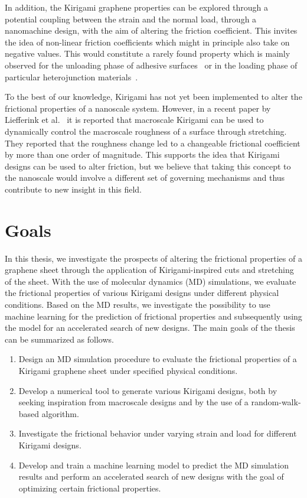 In addition, the Kirigami graphene properties can be explored through a
potential coupling between the strain and the normal load, through a
nanomachine design, with the aim of altering the friction coefficient. This
invites the idea of non-linear friction coefficients which might in principle also
take on negative values. This would constitute a rarely found property which is mainly observed for the unloading phase of adhesive
surfaces~\cite{deng_adhesion-dependent_2012} or in the loading phase of particular
heterojunction materials~\cite{Liu_2020, Mandelli_2019}.

To the best of our knowledge, Kirigami has not yet been implemented to alter the
frictional properties of a nanoscale system. However, in a recent paper by
Liefferink et al.~\cite{LIEFFERINK2021101475} it is reported that macroscale
Kirigami can be used to dynamically control the macroscale roughness of a
surface through stretching. They reported that the roughness change led to a
changeable frictional coefficient by more than one order of magnitude. This
supports the idea that Kirigami designs can be used to alter friction, but we
believe that taking this concept to the nanoscale would involve a different set
of governing mechanisms and thus contribute to new insight in this field.



\section{Goals}\label{sec:goals} In this thesis, we investigate the prospects of
altering the frictional properties of a graphene sheet through the application
of Kirigami-inspired cuts and stretching of the sheet. With the use of molecular
dynamics (\acrshort{MD}) simulations, we evaluate the frictional properties of
various Kirigami designs under different physical conditions. Based on the
\acrshort{MD} results, we investigate the possibility to use machine learning
for the prediction of frictional properties and subsequently using the model for
an accelerated search of new designs. The main goals of the thesis can be
summarized as follows.
\begin{enumerate} 
    \item Design an \acrshort{MD} simulation procedure to evaluate the
    frictional properties of a Kirigami graphene sheet under specified physical
    conditions.
    \item Develop a numerical tool to generate various Kirigami designs,
    both by seeking inspiration from macroscale designs and by the use of a
    random-walk-based algorithm.
    \item Investigate the frictional behavior under varying strain and load for
    different Kirigami designs.
    \item Develop and train a machine learning model to predict the
    \acrshort{MD} simulation results and perform an accelerated search of new
    designs with the goal of optimizing certain frictional properties.
\end{enumerate}



